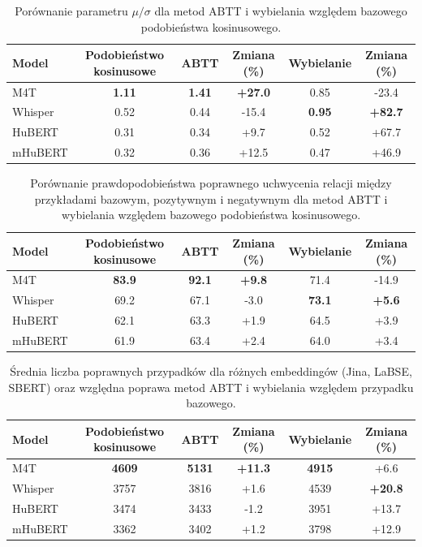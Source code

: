 \begin{table}[!ht]
\centering
\begin{tabular}{lccccc}
\toprule
Model &
\multicolumn{1}{c}{Podobieństwo kosinusowe} &
\multicolumn{1}{c}{ABTT} &
\multicolumn{1}{c}{Zmiana (\%)} &
\multicolumn{1}{c}{Wybielanie} &
\multicolumn{1}{c}{Zmiana (\%)} \\
\midrule
M4T     & \textbf{1.11} & \textbf{1.41} & \textbf{+27.0} & 0.85 & -23.4 \\
Whisper & 0.52 & 0.44 & -15.4 & \textbf{0.95} & \textbf{+82.7} \\
HuBERT  & 0.31 & 0.34 & +9.7  & 0.52 & +67.7 \\
mHuBERT & 0.32 & 0.36 & +12.5 & 0.47 & +46.9 \\
\bottomrule
\end{tabular}
\caption{Porównanie parametru $\mu/\sigma$ dla metod ABTT i wybielania względem bazowego podobieństwa kosinusowego.}
\label{tab:latent:compLoc}
\end{table}

\begin{table}[!ht]
\centering
\begin{tabular}{lccccc}
\toprule
Model &
\multicolumn{1}{c}{Podobieństwo kosinusowe} &
\multicolumn{1}{c}{ABTT} &
\multicolumn{1}{c}{Zmiana (\%)} &
\multicolumn{1}{c}{Wybielanie} &
\multicolumn{1}{c}{Zmiana (\%)} \\
\midrule
M4T     & \textbf{83.9} & \textbf{92.1} & \textbf{+9.8} & 71.4 & -14.9 \\
Whisper & 69.2 & 67.1 & -3.0 & \textbf{73.1} & \textbf{+5.6} \\
HuBERT  & 62.1 & 63.3 & +1.9 & 64.5 & +3.9 \\
mHuBERT & 61.9 & 63.4 & +2.4 & 64.0 & +3.4 \\
\bottomrule
\end{tabular}
\caption{Porównanie prawdopodobieństwa poprawnego uchwycenia relacji między przykładami bazowym, pozytywnym i negatywnym dla metod ABTT i wybielania względem bazowego podobieństwa kosinusowego.}
\label{tab:latent:compProb}
\end{table}

\begin{table}[!ht]
\centering
\begin{tabular}{lccccc}
\toprule
Model &
Podobieństwo kosinusowe &
ABTT  &
Zmiana (\%) &
Wybielanie &
Zmiana (\%) \\
\midrule
M4T
& \textbf{4609} & \textbf{5131} & \textbf{+11.3} & \textbf{4915} & +6.6 \\
Whisper
& 3757 & 3816 & +1.6  & 4539 & \textbf{+20.8} \\
HuBERT
& 3474 & 3433 & -1.2  & 3951 & +13.7 \\
mHuBERT
& 3362 & 3402 & +1.2  & 3798 & +12.9 \\
\bottomrule
\end{tabular}
\caption{Średnia liczba poprawnych przypadków dla różnych embeddingów (Jina, LaBSE, SBERT) oraz względna poprawa metod ABTT i wybielania względem przypadku bazowego.}
\label{tab:latent:processingCounts}
\end{table}

